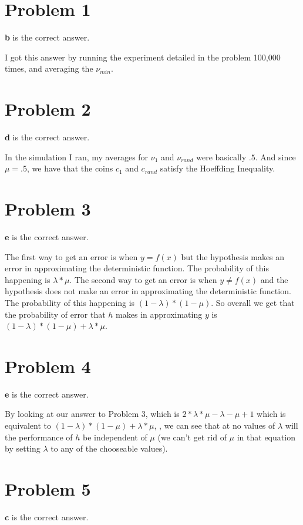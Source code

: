\documentclass{article}
\begin{document}
\section*{Problem 1}
\textbf{b} is the correct answer.

\noindent I got this answer by running the experiment detailed in the problem 100,000
times, and averaging the $\nu_{min}$.
\section*{Problem 2}
\textbf{d} is the correct answer.

\noindent In the simulation I ran, my averages for $\nu_1$ and $\nu_{rand}$ were
basically $.5$. And since $\mu = .5$, we have that the coins $c_1$ and $c_{rand}$
satisfy the Hoeffding Inequality.
\section*{Problem 3}
\textbf{e} is the correct answer.

\noindent The first way to get an error is when $y = f(x)$ but
the hypothesis makes an error in approximating the deterministic function.
The probability of this happening is $\lambda * \mu$. The second way to get
an error is when $y \neq f(x)$ and the hypothesis does not
make an error in approximating the deterministic function. The probability of
this happening is $(1 - \lambda) * (1 - \mu)$. So overall we get that the
probability of error that $h$ makes in approximating $y$ is $(1 - \lambda) *
(1 - \mu) + \lambda * \mu$.
\section*{Problem 4}
\textbf{e} is the correct answer.

\noindent By looking at our answer to Problem 3, which is $2*\lambda*\mu - \lambda
- \mu + 1$ which is equivalent to $(1 - \lambda) * (1 - \mu) + \lambda * \mu$,
, we can see that at no values of $\lambda$ will the performance of $h$
be independent of $\mu$ (we can't get rid of $\mu$ in that equation by setting
$\lambda$ to any of the chooseable values).
\section*{Problem 5}
\textbf{c} is the correct answer.
\end{document}
